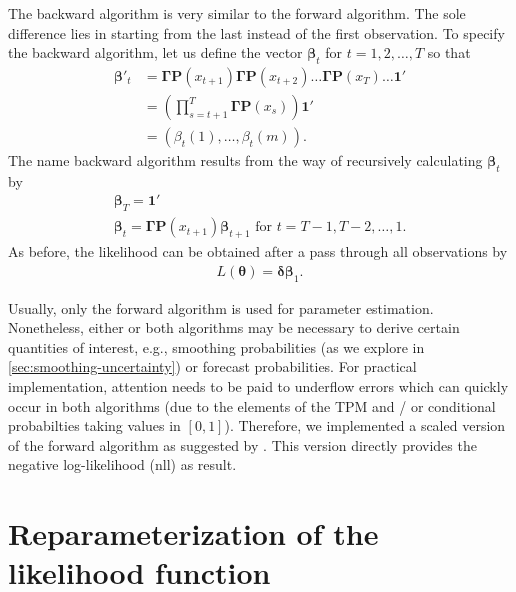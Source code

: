 \documentclass[]{interact}\usepackage[]{graphicx}\usepackage[dvipsnames]{xcolor}
\theoremstyle{plain}%
\theoremstyle{definition}
\theoremstyle{remark}
\begin{document}
The backward algorithm is very similar to the forward algorithm. The sole difference lies in starting from the last instead of the first observation. To specify the backward algorithm, let us define the vector $\bm{\beta}_t$ for $t = 1, 2, \ldots, T$ so that
\begin{align*}
\bm{\beta}'_t &= \bm{\Gamma} \bm{P}(x_{t+1}) \bm{\Gamma} \bm{P}(x_{t+2}) \ldots \bm{\Gamma} \bm{P}(x_T) \ldots \bm{1}'\\
&= \left(\prod_{s=t+1}^{T}\bm{\Gamma} \bm{P}(x_s) \right) \bm{1}'\\
&= \left( \beta_t(1), \ldots, \beta_t(m) \right).
\end{align*}
The name backward algorithm results from the way of recursively calculating $\bm{\beta}_t$ by
\begin{gather*}
\bm{\beta}_T = \bm{1}'\\
\bm{\beta}_t = \bm{\Gamma} \bm{P}(x_{t+1}) \bm{\beta}_{t+1} \text{ for } t = T-1, T-2, \ldots, 1.
\end{gather*}
As before, the likelihood can be obtained after a pass through all observations by
\begin{gather*}
L(\bm{\theta}) = \bm{\delta} \bm{\beta}_1.
\end{gather*}

Usually, only the forward algorithm is used for parameter estimation.
Nonetheless, either or both algorithms may be necessary to derive certain quantities of interest, e.g., smoothing probabilities (as we explore in \autoref{sec:smoothing-uncertainty}) or forecast probabilities. For practical implementation, attention needs to be paid to underflow errors which can quickly occur in both algorithms (due to the elements of the TPM and / or conditional probabilties taking values in $[0,1]$). Therefore, we implemented a scaled version of the forward algorithm as suggested by \cite[p.~48]{zucchini}. This version directly provides the negative log-likelihood (nll) as result.



\section{Reparameterization of the likelihood function}
\label{sec:appendix-reparameterization}
\end{document}
